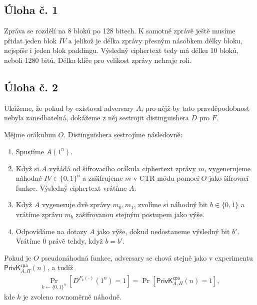 \documentclass{scrartcl}
\DeclareMathOperator{\Prob}{\text{Pr}}
\begin{document}
\subsection*{Úloha č. 1}
Zpráva se rozdělí na 8 bloků po 128 bitech. K samotné zprávě ještě musíme přidat jeden blok $IV$ a jelikož je délka zprávy přesným násobkem délky bloku, nejspíše i jeden blok paddingu. Výsledný ciphertext tedy má délku 10 bloků, neboli 1280 bitů. Délka klíče pro velikost zprávy nehraje roli.

\subsection*{Úloha č. 2}
Ukážeme, že pokud by existoval adversary $A$, pro nějž by tato pravděpodobnost nebyla zanedbatelná, dokážeme z něj sestrojit distinguishera $D$ pro $F$.

Mějme orákulum $O$. Distinguishera sestrojíme následovně:
\begin{enumerate}
    \item Spustíme $A(1^n)$.
    \item Když si $A$ vyžádá od šifrovacího orákula ciphertext zprávy $m$, vygenerujeme náhodné $IV \in \{0,1\}^n$ a zašifrujeme $m$ v CTR módu pomocí $O$ jako šifrovací funkce. Výsledný ciphertext vrátíme $A$.
    \item Když $A$ vygeneruje dvě zprávy $m_0, m_1$, zvolíme si náhodný bit $b \in \{0,1\}$ a vrátíme zprávu $m_b$ zašifrovanou stejným postupem jako výše.
    \item Odpovídáme na dotazy $A$ jako výše, dokud nedostaneme výsledný bit $b'$. Vrátíme 0 právě tehdy, když $b = b'$.
\end{enumerate}

Pokud je $O$ pseudonáhodná funkce, adversary se chová stejně jako v experimentu $\textsf{PrivK}^\textsf{cpa}_{A, \Pi}(n)$, a tudíž
\begin{align*}
    \Prob_{k\leftarrow \{0,1\}^n}\left[ D^{F_k(\cdot)}(1^n) = 1 \right] = \Prob\left[ \textsf{PrivK}^\textsf{cpa}_{A, \Pi}(n) = 1 \right],
\end{align*}
kde $k$ je zvoleno rovnoměrně náhodně. 
\end{document}
